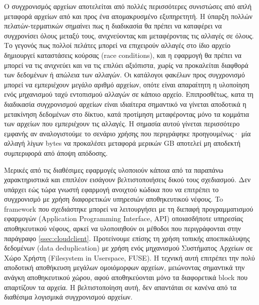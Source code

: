  Ο συγχρονισμός αρχείων αποτελείται από πολλές περισσότερες συνιστώσες από απλή μεταφορά αρχείων από και προς ένα απομακρυσμένο εξυπηρετητή. Η ύπαρξη πολλών πελατών-τερματικών σημαίνει πως η διαδικασία θα πρέπει να καταφέρει να συγχρονίσει όλους μεταξύ τους, ανιχνεύοντας και μεταφέροντας τις αλλαγές σε όλους. Το γεγονός πως πολλοί πελάτες μπορεί να επιχειρούν αλλαγές στο ίδιο αρχείο δημιουργεί καταστάσεις κούρσας (race conditions), και η εφαρμογή θα πρέπει να μπορεί να τις ανιχνεύει και να τις επιλύει αξιόπιστα, χωρίς να προκαλείται διαφθορά των δεδομένων ή απώλεια των αλλαγών. Οι κατάλογοι φακέλων προς συγχρονισμό μπορεί να εμπεριέχουν μεγάλο αριθμό αρχείων, οπότε είναι απαραίτητη η υλοποίηση ενός μηχανισμού ταχύ εντοπισμού αλλαγών σε κάποιο αρχείο. Επιπροσθέτως, κατα τη διαδικασία συγχρονισμού αρχείων είναι ιδιαίτερα σημαντικό να γίνεται αποδοτικά η μετακίνηση δεδομένων στο δίκτυο, κατά προτίμηση μεταφέροντας μόνο τα κομμάτια των αρχείων που εμπεριέχουν τις αλλαγές. Η σημασία αυτού γίνεται περισσότερο εμφανής αν αναλογιστούμε το σενάριο χρήσης που περιγράφηκε προηγουμένως· μία αλλαγή λίγων bytes να προκαλέσει μεταφορά μερικών GB αποτελεί μη αποδεκτή συμπεριφορά από άποψη απόδοσης.

  Μερικές από τις διαθέσιμες εφαρμογές υλοποιούν κάποια από τα παραπάνω χαρακτηριστικά και επιπλέον εισάγουν βελτιστοποιήσεις δικού τους σχεδιασμού. Δεν υπάρχει εώς τώρα γνωστή εφαρμογή ανοιχτού κώδικα που να επιτρέπει το συγχρονισμό με χρήση διαφορετικών υπηρεσιών αποθηκευτικού νέφους. To framework που σχεδιάστηκε μπορεί να λειτουργήσει με τη διεπαφή προγραμματισμού εφαρμογών (Application Programming Interface, API) οποιασδήποτε υπηρεσίας αποθηκευτικού νέφους, αρκεί να υλοποιηθούν οι μέθοδοι που περιγράφονται στην παράγραφο \ref{ssec:cloudclient}. Προτείνουμε επίσης τη χρήση τοπικής αποεπικάλυψης δεδομένων (data deduplication) με χρήση ενός μηχανισμού Συστήματος Αρχείων σε Χώρο Χρήστη (Filesystem in Userspace, FUSE). Η τεχνική αυτή επιτρέπει την πολύ αποδοτική αποθήκευση μεγάλων ομοιόμορφων αρχείων, μειώνοντας σημαντικά την ανάγκη αποθηκευτικού χώρου, αφού αποθηκεύονται μόνο τα διαφορετικά block που απαρτίζουν τα αρχεία. Η βελτιστοποίηση αυτή, δεν απαντάται σε κανένα από τα διαθέσιμα λογισμικά συγχρονισμού αρχείων.

